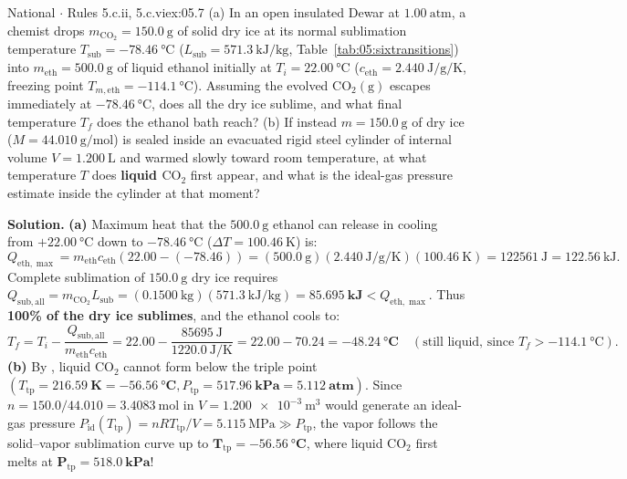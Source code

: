 \begin{workedexample}{National $\cdot$ Rules 5.c.ii, 5.c.vi}{ex:05.7}
(a) In an open insulated Dewar at $\SI{1.00}{\text{atm}}$, a chemist drops $m_{\mathrm{CO_2}} = \SI{150.0}{\gram}$ of solid dry ice at its normal sublimation temperature $T_{\mathrm{sub}} = -\SI{78.46}{\celsius}$ ($L_{\mathrm{sub}} = \SI{571.3}{\kilo\joule\per\kilogram}$, Table~\ref{tab:05:sixtransitions}) into $m_{\mathrm{eth}} = \SI{500.0}{\gram}$ of liquid ethanol initially at $T_i = \SI{22.00}{\celsius}$ ($c_{\mathrm{eth}} = \SI{2.440}{\joule\per\gram\per\kelvin}$, freezing point $T_{m,\mathrm{eth}} = -\SI{114.1}{\celsius}$). Assuming the evolved $\mathrm{CO_2(g)}$ escapes immediately at $-\SI{78.46}{\celsius}$, does all the dry ice sublime, and what final temperature $T_f$ does the ethanol bath reach?
(b) If instead $m = \SI{150.0}{\gram}$ of dry ice ($M = \SI{44.010}{\gram\per\mole}$) is sealed inside an evacuated rigid steel cylinder of internal volume $V = \SI{1.200}{\liter}$ and warmed slowly toward room temperature, at what temperature $T$ does \textbf{liquid $\mathrm{CO_2}$} first appear, and what is the ideal-gas pressure estimate inside the cylinder at that moment?

\textbf{Solution.}
\textbf{(a)} Maximum heat that the $\SI{500.0}{\gram}$ ethanol can release in cooling from $+\SI{22.00}{\celsius}$ down to $-\SI{78.46}{\celsius}$ ($\Delta T = \SI{100.46}{\kelvin}$) is:
\[
  Q_{\mathrm{eth,\max}} = m_{\mathrm{eth}} c_{\mathrm{eth}}(22.00 - (-78.46)) = (\SI{500.0}{\gram})(\SI{2.440}{\joule\per\gram\per\kelvin})(\SI{100.46}{\kelvin}) = \SI{122561}{\joule} = \SI{122.56}{\kilo\joule}.
\]
Complete sublimation of $\SI{150.0}{\gram}$ dry ice requires $Q_{\mathrm{sub,all}} = m_{\mathrm{CO_2}} L_{\mathrm{sub}} = (\SI{0.1500}{\kilogram})(\SI{571.3}{\kilo\joule\per\kilogram}) = \mathbf{\SI{85.695}{\kilo\joule}} < Q_{\mathrm{eth,\max}}$. Thus \textbf{100\% of the dry ice sublimes}, and the ethanol cools to:
\[
  T_f = T_i - \frac{Q_{\mathrm{sub,all}}}{m_{\mathrm{eth}} c_{\mathrm{eth}}} = 22.00 - \frac{\SI{85695}{\joule}}{\SI{1220.0}{\joule\per\kelvin}} = 22.00 - 70.24 = \mathbf{-\SI{48.24}{\celsius}} \quad (\text{still liquid, since } T_f > -\SI{114.1}{\celsius}).
\]
\textbf{(b)} By , liquid $\mathrm{CO_2}$ cannot form below the triple point $(T_{\mathrm{tp}} = \mathbf{\SI{216.59}{\kelvin} = -\SI{56.56}{\celsius}}, P_{\mathrm{tp}} = \mathbf{\SI{517.96}{\kilo\pascal} = \SI{5.112}{\text{atm}}})$. Since $n = 150.0/44.010 = \SI{3.4083}{\mole}$ in $V = \SI{1.200e-3}{\cubic\meter}$ would generate an ideal-gas pressure $P_{\mathrm{id}}(T_{\mathrm{tp}}) = nRT_{\mathrm{tp}}/V = \SI{5.115}{\mega\pascal} \gg P_{\mathrm{tp}}$, the vapor follows the solid--vapor sublimation curve up to $\mathbf{T_{\mathrm{tp}} = -\SI{56.56}{\celsius}}$, where liquid $\mathrm{CO_2}$ first melts at $\mathbf{P_{\mathrm{tp}} = \SI{518.0}{\kilo\pascal}}$!
\end{workedexample}

